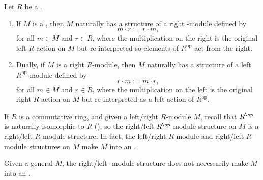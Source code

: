\begin{definition} \label{definition:module_structure_induced_from_a_module_over_the_opposite_ring}
Let $R$ be a .

\begin{enumerate}
    \item If $M$ is a , then $M$ naturally has a structure of a right -module defined by
    $$ m \cdot r := r \cdot m, $$
    for all $m \in M$ and $r \in R$, where the multiplication on the right is the original left $R$-action on $M$ but re-interpreted so elements of $R^\mathrm{op}$ act from the right.
    
    \item Dually, if $M$ is a right $R$-module, then $M$ naturally has a structure of a left $R^\mathrm{op}$-module defined by
    $$ r \cdot m := m \cdot r, $$
    for all $m \in M$ and $r \in R$, where the multiplication on the left is the original right $R$-action on $M$ but re-interpreted as a left action of $R^\mathrm{op}$.
\end{enumerate}
If $R$ is a commutative ring, and given a left/right $R$-module $M$, recall that $R^{\op}$ is naturally isomorphic to $R$ (), so the right/left $R^{\op}$-module structure on $M$ is a right/left $R$-module structure. In fact, the left/right $R$-module and right/left $R$-module structures on $M$ make $M$ into an .
\end{definition}

\begin{remark}
    Given a general  $M$, the right/left -module structure does not necessarily make $M$ into an .
\end{remark}
